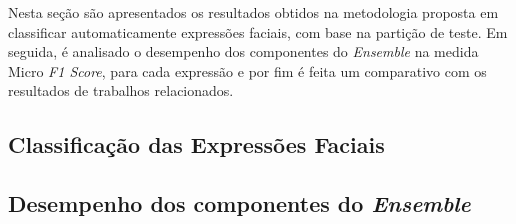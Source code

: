 Nesta seção são apresentados os resultados obtidos na metodologia proposta em classificar automaticamente expressões faciais, com base na partição de teste. Em seguida, é analisado o desempenho dos componentes do \textit{Ensemble} na medida Micro \textit{F1 Score}, para cada expressão e por fim  é feita um comparativo com os resultados de trabalhos relacionados. %

\subsection{Classificação das Expressões Faciais}


\subsection{Desempenho dos componentes do \textit{Ensemble}}


% 
